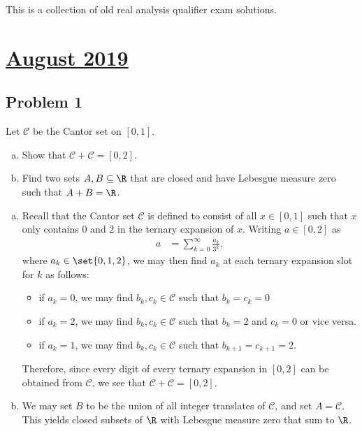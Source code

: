 \documentclass[10pt]{mypackage}
\begin{document}
\RaggedRight
This is a collection of old real analysis qualifier exam solutions.
\section{\href{https://math.virginia.edu/graduate/exams/analysis/2019Aug_real.pdf}{August 2019}}%
\subsection{Problem 1}%
\begin{problem}
  Let $\mathcal{C}$ be the Cantor set on $[0,1]$.
  \begin{enumerate}[(a)]
    \item Show that $\mathcal{C} + \mathcal{C} = [0,2]$.
    \item Find two sets $A,B\subseteq \R$ that are closed and have Lebesgue measure zero such that $A+B = \R$.
  \end{enumerate}
\end{problem}
\begin{enumerate}[(a)]
  \item Recall that the Cantor set $\mathcal{C}$ is defined to consist of all $x\in [0,1]$ such that $x$ only contains $0$ and $2$ in the ternary expansion of $x$. Writing $a\in [0,2]$ as
    \begin{align*}
      a &= \sum_{k=0}^{\infty}\frac{a_k}{3^{k}},
    \end{align*}
    where $a_k\in\set{0,1,2}$, we may then find $a_k$ at each ternary expansion slot for $k$ as follows:
    \begin{itemize}
      \item if $a_k = 0$, we may find $b_k,c_k\in \mathcal{C}$ such that $b_k = c_k = 0$
      \item if $a_k = 2$, we may find $b_k,c_k\in \mathcal{C}$ such that $b_k = 2$ and $c_k = 0$ or vice versa.
      \item if $a_k = 1$, we may find $b_k,c_k\in \mathcal{C}$ such that $b_{k+1} = c_{k+1} = 2$.
    \end{itemize}
    Therefore, since every digit of every ternary expansion in $[0,2]$ can be obtained from $\mathcal{C}$, we see that $\mathcal{C} + \mathcal{C} = [0,2]$.
  \item We may set $B$ to be the union of all integer translates of $\mathcal{C}$, and set $A = \mathcal{C}$. This yields closed subsets of $\R$ with Lebesgue measure zero that sum to $\R$.
\end{enumerate}
\end{document}
